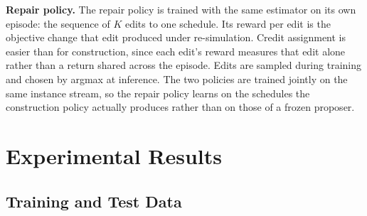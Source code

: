 \textbf{Repair policy.} The repair policy is trained with the same estimator on its own episode: the sequence of $K$ edits to one schedule. Its reward per edit is the objective change that edit produced under re-simulation. Credit assignment is easier than for construction, since each edit's reward measures that edit alone rather than a return shared across the episode. Edits are sampled during training and chosen by argmax at inference. The two policies are trained jointly on the same instance stream, so the repair policy learns on the schedules the construction policy actually produces rather than on those of a frozen proposer.

\section{Experimental Results}
\label{sec:results}

\subsection{Training and Test Data}
\label{sec:data}

